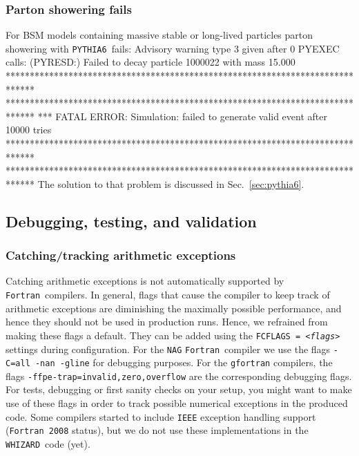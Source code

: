 \documentclass[12pt]{book}
\newenvironment{Code}%
  {\begingroup\footnotesize
   \quote
   \Verbatim[frame=single]}%
  {\endVerbatim
   \endquote
   \endgroup\noindent}
\newcommand{\ttt}[1]{\texttt{#1}}
\newcommand{\whizard}{\ttt{WHIZARD}}
\newcommand{\pythiasix}{\ttt{PYTHIA6}}
\newcommand{\fortran}{\ttt{Fortran}}
\begin{document}
\subsubsection{Parton showering fails}

For BSM models containing massive stable or long-lived particles
parton showering with \pythiasix\ fails:
\begin{Code}
     Advisory warning type 3 given after        0 PYEXEC calls:
     (PYRESD:) Failed to decay particle  1000022 with mass   15.000
******************************************************************************
******************************************************************************
*** FATAL ERROR: Simulation: failed to generate valid event after 10000 tries
******************************************************************************
******************************************************************************
\end{Code}
The solution to that problem is discussed in Sec.~\ref{sec:pythia6}.

\vspace{1cm}



\subsection{Debugging, testing, and validation}


\subsubsection{Catching/tracking arithmetic exceptions}

Catching arithmetic exceptions is not automatically supported by
\fortran\ compilers. In general, flags that cause the compiler to keep
track of arithmetic exceptions are diminishing the maximally possible
performance, and hence they should not be used in production
runs. Hence, we refrained from making these flags a default.
They can be added using the \ttt{FCFLAGS = {\em <flags>}} settings during
configuration. For the \ttt{NAG} \fortran\ compiler we use the flags
\ttt{-C=all -nan -gline} for debugging purposes. For the \ttt{gfortran}
compilers, the flags \ttt{-ffpe-trap=invalid,zero,overflow} are the
corresponding debugging flags. For tests, debugging or first sanity
checks on your setup, you might want to make use of these flags in
order to track possible numerical exceptions in the produced code.
Some compilers started to include \ttt{IEEE} exception handling
support (\ttt{Fortran 2008} status), but we do not use these
implementations in the \whizard\ code (yet).
\end{document}
